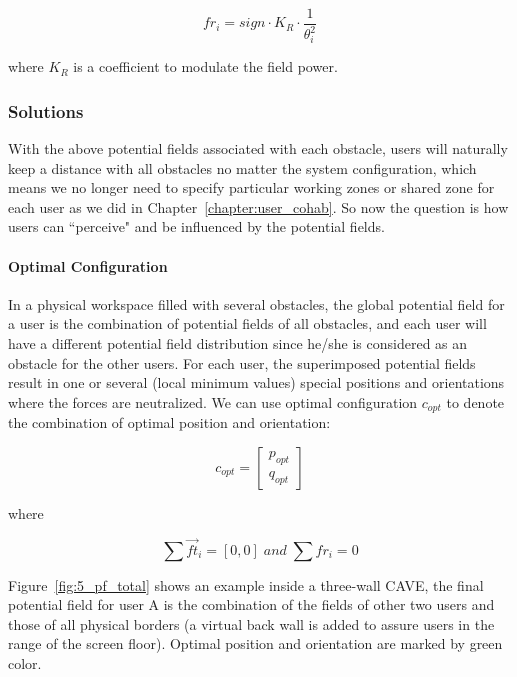 \begin{equation}
{fr}_{i}=sign \cdot K_{R} \cdot \frac{1}{\theta_{i}^2}
\end{equation}

where $K_{R}$ is a coefficient to modulate the field power.

\subsubsection{Solutions}
\label{sec:5_solution}

With the above potential fields associated with each obstacle, users will naturally keep a distance with all obstacles no matter the system configuration, which means we no longer need to specify particular working zones or shared zone for each user as we did in Chapter~\ref{chapter:user_cohab}. So now the question is how users can ``perceive" and be influenced by the potential fields.

\paragraph{Optimal Configuration} In a physical workspace filled with several obstacles, the global potential field for a user is the combination of potential fields of all obstacles, and each user will have a different potential field distribution since he/she is considered as an obstacle for the other users. For each user, the superimposed potential fields result in one or several (local minimum values) special positions and orientations where the forces are neutralized. We can use optimal configuration $c_{opt}$ to denote the combination of optimal position and orientation:

\begin{equation}
c_{opt}=
\begin{bmatrix}
p_{opt} \\ q_{opt}
\end{bmatrix}
\end{equation}

where

\begin{equation}
\sum \overrightarrow{ft}_{i}=[0, 0]\; and\; \sum fr_{i}=0
\end{equation}


Figure~\ref{fig:5_pf_total} shows an example inside a three-wall CAVE, the final potential field for user A is the combination of the fields of other two users and those of all physical borders (a virtual back wall is added to assure users in the range of the screen floor). Optimal position and orientation are marked by green color.

